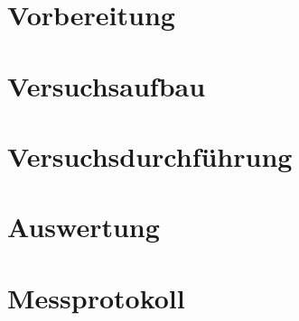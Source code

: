 \documentclass{article}
\begin{document}


\section{Vorbereitung}


\section{Versuchsaufbau}
%

\section{Versuchsdurchführung}
%

\section{Auswertung}
%

\Appendix
\section{Messprotokoll}
\end{document}
